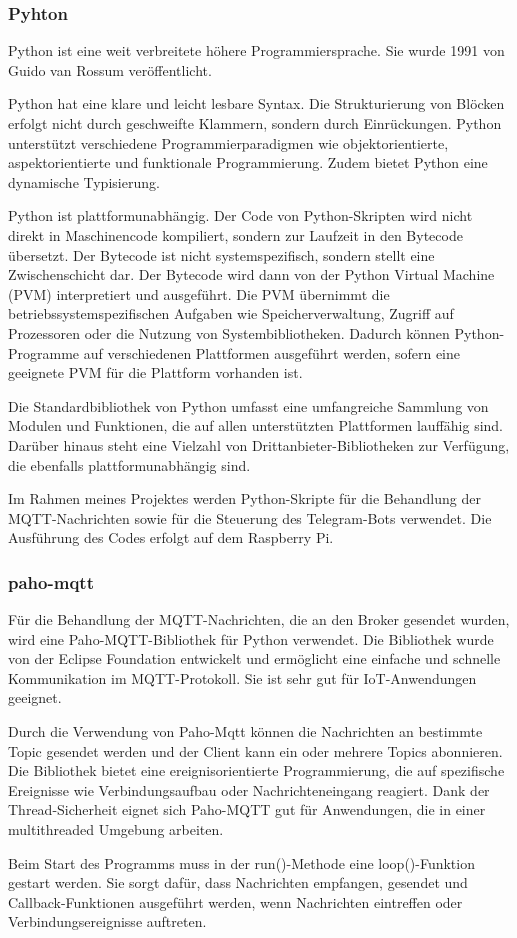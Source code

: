 \documentclass[12pt, letterpaper]{article}
\begin{document}
\subsubsection{Pyhton}
\par Python ist eine weit verbreitete höhere Programmiersprache. Sie wurde 1991 von Guido van Rossum veröffentlicht.
\par Python hat eine klare und leicht lesbare Syntax. Die Strukturierung von Blöcken erfolgt nicht durch geschweifte Klammern, sondern durch Einrückungen. Python unterstützt verschiedene Programmierparadigmen wie objektorientierte, aspektorientierte und funktionale Programmierung. Zudem bietet Python eine dynamische Typisierung.
\par Python ist plattformunabhängig. Der Code von Python-Skripten wird nicht direkt in Maschinencode kompiliert, sondern zur Laufzeit in den Bytecode übersetzt. Der Bytecode ist nicht systemspezifisch, sondern stellt eine Zwischenschicht dar. Der Bytecode wird dann von der Python Virtual Machine (PVM) interpretiert und ausgeführt. Die PVM übernimmt die betriebssystemspezifischen Aufgaben wie Speicherverwaltung, Zugriff auf Prozessoren oder die Nutzung von Systembibliotheken. Dadurch können Python-Programme auf verschiedenen Plattformen ausgeführt werden, sofern eine geeignete PVM für die Plattform vorhanden ist.
\par Die Standardbibliothek von Python umfasst eine umfangreiche Sammlung von Modulen und Funktionen, die auf allen unterstützten Plattformen lauffähig sind. Darüber hinaus steht eine Vielzahl von Drittanbieter-Bibliotheken zur Verfügung, die ebenfalls plattformunabhängig sind. 
\par Im Rahmen meines Projektes werden Python-Skripte für die Behandlung der MQTT-Nachrichten sowie für die Steuerung des Telegram-Bots verwendet. Die Ausführung des Codes erfolgt auf dem Raspberry Pi.
\subsubsection{paho-mqtt}
\par Für die Behandlung der MQTT-Nachrichten, die an den Broker gesendet wurden, wird eine Paho-MQTT-Bibliothek für Python verwendet. Die Bibliothek wurde von der Eclipse Foundation entwickelt und ermöglicht eine einfache und schnelle Kommunikation im MQTT-Protokoll. Sie ist sehr gut für IoT-Anwendungen geeignet. 
\par Durch die Verwendung von Paho-Mqtt können die Nachrichten an bestimmte Topic gesendet werden und der Client kann ein oder mehrere Topics abonnieren. Die Bibliothek bietet eine ereignisorientierte Programmierung, die auf spezifische Ereignisse wie Verbindungsaufbau oder Nachrichteneingang reagiert. Dank der Thread-Sicherheit eignet sich Paho-MQTT gut für Anwendungen, die in einer multithreaded Umgebung arbeiten.
\par Beim Start des Programms muss in der run()-Methode eine loop()-Funktion gestart werden. Sie sorgt dafür, dass Nachrichten empfangen, gesendet und Callback-Funktionen ausgeführt werden, wenn Nachrichten eintreffen oder Verbindungsereignisse auftreten.
\end{document}
